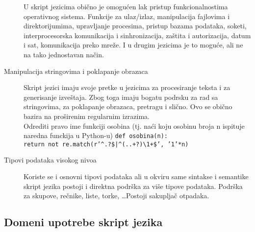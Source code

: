 \documentclass[../main.tex]{subfiles}
\begin{document}
\begin{description}
		U skript jezicima obično je omogućen lak pristup funkcionalnostima operativnog sistema. Funkcije za ulaz/izlaz, manipulacija fajlovima i direktorijumima, upravljanje procesima, pristup bazama podataka, soketi, interprocesorska komunikacija i sinhronizacija, zaštita i autorizacija, datum i sat, komunikacija preko mreže. I u drugim jezicima je to moguće, ali ne na tako jednostavan način.

	\item[Manipulacija stringovima i poklapanje obrazaca] \hfill
	
		Skript jezici imaju svoje pretke u jezicima za procesiranje teksta i za generisanje izveštaja. Zbog toga imaju bogatu podrsku za rad sa stringovima, za poklapanje obrazaca, pretragu i slično. Ovo se obično bazira na proširenim regularnim izrazima. 
\\
Odrediti pravo ime funkciji osobina (tj. naći koju osobinu broja n ispituje naredna funckija u Python-u)
\texttt{def osobina(n):} \\
\tab \texttt{return not re.match(r'\textasciicircum .?\$|\textasciicircum(..+?)\textbackslash1+\$',  '1'*n)}

	\item[Tipovi podataka visokog nivoa] \hfill

		Koriste se i osnovni tipovi podataka ali u okviru same sintakse i semantike skript jezika postoji i direktna podrška za više tipove podataka. Podrška za skupove, rečnike, liste, torke, \ldots Postoji sakupljač otpadaka.
\end{description}

\subsection{Domeni upotrebe skript jezika}										%
\end{document}
